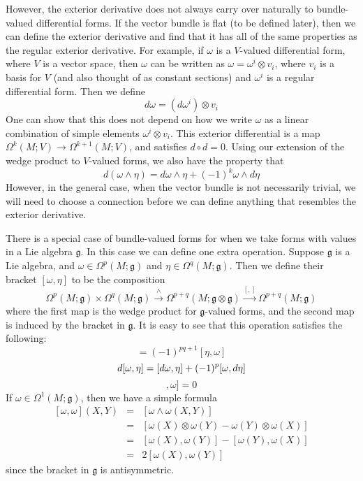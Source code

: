 However, the exterior derivative does not always carry over naturally to bundle-valued differential forms. If the vector bundle is flat (to be defined later), then we can define the exterior derivative and find that it has all of the same properties as the regular exterior derivative. For example, if $\omega$ is a $V$-valued differential form, where $V$ is a vector space, then $\omega$ can be written as $\omega = \omega^i \otimes v_i$, where $v_i$ is a basis for $V$ (and also thought of as constant sections) and $\omega^i$ is a regular differential form. Then we define
\[ d \omega = \left( d\omega^i \right) \otimes v_i \]
One can show that this does not depend on how we write $\omega$ as a linear combination of simple elements $\omega^i \otimes v_i$. This exterior differential is a map $\Omega^k(M;V) \rightarrow \Omega^{k+1}(M;V)$, and satisfies $d \circ d = 0$. Using our extension of the wedge product to $V$-valued forms, we also have the property that
\[ d(\omega \wedge \eta) = d\omega \wedge \eta + (-1)^k \omega \wedge d\eta \]
However, in the general case, when the vector bundle is not necessarily trivial, we will need to choose a connection before we can define anything that resembles the exterior derivative. 

There is a special case of bundle-valued forms for when we take forms with values in a Lie algebra $\mathfrak g$. In this case we can define one extra operation. Suppose $\mathfrak g$ is a Lie algebra, and $\omega \in \Omega^p(M;\mathfrak g)$ and $\eta \in \Omega^q(M;\mathfrak g)$. Then we define their bracket $[\omega,\eta]$ to be the composition
\[ \Omega^p(M;\mathfrak g) \times \Omega^q(M;\mathfrak g) \stackrel{\wedge}{\longrightarrow} \Omega^{p+q}(M;\mathfrak g \otimes \mathfrak g) \stackrel{[,]}{\longrightarrow} \Omega^{p+q}(M;\mathfrak g) \]
where the first map is the wedge product for $\mathfrak g$-valued forms, and the second map is induced by the bracket in $\mathfrak g$. It is easy to see that this operation satisfies the following:
\begin{equation}
[\omega,\eta] = (-1)^{pq+1}[\eta,\omega]
\end{equation}
\begin{equation}
d[\omega,\eta] = [d\omega,\eta] + (-1)^p [\omega,d\eta] \\
\end{equation}
\begin{equation}
[[\omega,\omega],\omega] = 0
\end{equation}
If $\omega \in \Omega^1(M;\mathfrak g)$, then we have a simple formula
\begin{equation}
\label{bracket of two 1-forms}
\begin{array}{rcl}
	[\omega,\omega](X,Y) &=& [\omega \wedge \omega(X,Y)] \\
	                     &=& [\omega(X) \otimes \omega(Y) - \omega(Y) \otimes \omega(X)] \\
	                     &=& [\omega(X),\omega(Y)] - [\omega(Y),\omega(X)] \\
	                     &=& 2[\omega(X),\omega(Y)]
\end{array}
\end{equation}
since the bracket in $\mathfrak g$ is antisymmetric.

